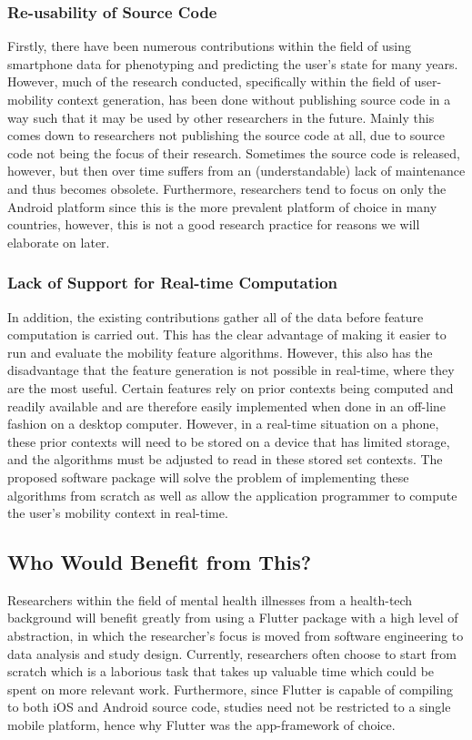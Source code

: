 \subsubsection{Re-usability of Source Code}
Firstly, there have been numerous contributions within the field of using smartphone data for phenotyping and predicting the user's state for many years. However, much of the research conducted, specifically within the field of user-mobility context generation, has been done without publishing source code in a way such that it may be used by other researchers in the future. Mainly this comes down to researchers not publishing the source code at all, due to source code not being the focus of their research. Sometimes the source code is released, however, but then over time suffers from an (understandable) lack of maintenance and thus becomes obsolete. Furthermore, researchers tend to focus on only the Android platform since this is the more prevalent platform of choice in many countries, however, this is not a good research practice for reasons we will elaborate on later.

\subsubsection{Lack of Support for Real-time Computation}
In addition, the existing contributions gather all of the data before feature computation is carried out. This has the clear advantage of making it easier to run and evaluate the mobility feature algorithms. However, this also has the disadvantage that the feature generation is not possible in real-time, where they are the most useful. Certain features rely on prior contexts being computed and readily available and are therefore easily implemented when done in an off-line fashion on a desktop computer. However, in a real-time situation on a phone, these prior contexts will need to be stored on a device that has limited storage, and the algorithms must be adjusted to read in these stored set contexts. The proposed software package will solve the problem of implementing these algorithms from scratch as well as allow the application programmer to compute the user's mobility context in real-time.

\subsection{Who Would Benefit from This?}
Researchers within the field of mental health illnesses from a health-tech background will benefit greatly from using a Flutter package with a high level of abstraction, in which the researcher's focus is moved from software engineering to data analysis and study design. Currently, researchers often choose to start from scratch which is a laborious task that takes up valuable time which could be spent on more relevant work. Furthermore, since Flutter is capable of compiling to both iOS and Android source code, studies need not be restricted to a single mobile platform, hence why Flutter was the app-framework of choice.\\


